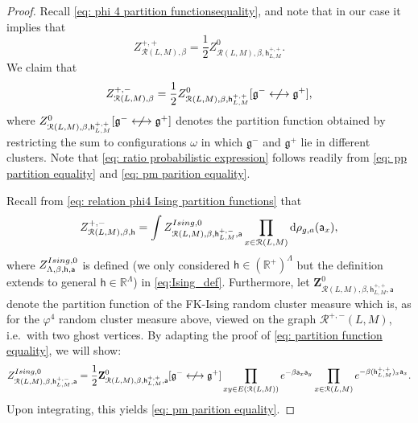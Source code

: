 \documentclass[11pt,a4paper]{article}
\theoremstyle{definition}
\numberwithin{equation}{section}
\newcommand\fg{\mathfrak{g}}
\begin{document}
\begin{proof}
Recall \eqref{eq: phi 4 partition functionsequality}, and note that 
in our case it implies that 
\begin{equation}\label{eq: pp partition equality}
Z^{+,+}_{\mathcal{R}(L,M),\beta}=\frac{1}{2}Z^0_{\mathcal R(L,M),\beta,\mathsf{h}^{+,+}_{L,M}}.    
\end{equation}
We claim that 
\begin{equation}\label{eq: pm parition equality}
Z^{+,-}_{\mathcal{R}(L,M),\beta}=\frac{1}{2}Z^0_{\mathcal R(L,M),\beta,\mathsf{h}^{+,+}_{L,M}}[\fg^{-} \centernot\longleftrightarrow \fg^{+}],   
\end{equation}
where $Z^0_{\mathcal R(L,M),\beta,\mathsf{h}^{+,+}_{L,M}}[\fg^{-} \centernot\longleftrightarrow \fg^{+}]$ denotes the partition function obtained by restricting the sum to configurations $\omega$ in which $\fg^{-}$ and $\fg^{+}$ lie in different clusters. Note that \eqref{eq: ratio probabilistic expression} follows readily from \eqref{eq: pp partition equality} and \eqref{eq: pm parition equality}.

Recall from \eqref{eq: relation phi4 Ising partition functions} that
\begin{equation}
Z^{+,-}_{\mathcal{R}(L,M),\beta,\mathsf{h}}=\int Z^{\rm Ising,0}_{\mathcal{R}(L,M),\beta, \mathsf{h}^{+,-}_{L,M},\mathsf{a}}
\prod_{x\in \mathcal{R}(L,M)}\mathrm{d} \rho_{g,a}(\mathsf{a}_x),  
\end{equation}
where $Z^{{\rm Ising},0}_{\Lambda,\beta,\mathsf h, \mathsf a}$ is defined (we only considered $\mathsf{h}\in (\mathbb R^+)^\Lambda$ but the definition extends to general $\mathsf{h}\in \mathbb R^\Lambda$) in \eqref{eq:Ising_def}. Furthermore, let $\mathbf{Z}^0_{\mathcal R(L,M),\beta,\mathsf h^{+,+}_{L,M}, \mathsf a}$ denote the partition function of the FK-Ising random cluster measure which is, as for the $\varphi^4$ random cluster measure above, viewed on the graph $\mathcal R^{+,-}(L,M)$, i.e.\ with two ghost vertices. By adapting the proof of \eqref{eq: partition function equality}, we will show: 
\begin{equation}\label{eq: partition function equality 2}
Z^{\textup{Ising},0}_{\mathcal{R}(L,M),\beta,\mathsf{h}^{+,-}_{L,M},\mathsf{a}}=\frac{1}{2}{\bf Z}^{0}_{\mathcal{R}(L,M),\beta, \mathsf{h}^{+,+}_{L,M},\mathsf{a}}[\fg^{-} \centernot\longleftrightarrow \fg^{+}]\prod_{xy\in E(\mathcal{R}(L,M))} e^{-\beta \mathsf{a}_x\mathsf{a}_y}\prod_{x\in \mathcal{R}(L,M)}e^{-\beta (\mathsf{h}^{+,+}_{L,M})_x\mathsf{a}_x}.    
\end{equation}
Upon integrating, this yields \eqref{eq: pm parition equality}.


\end{proof}
\end{document}
